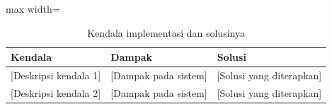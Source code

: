 \begin{table}[H]
  \centering
  \caption{Kendala implementasi dan solusinya}
  \label{tab:5.kendala}
  \begin{adjustbox}{max width=\textwidth}
  \begin{tabular}{p{5cm}p{4cm}p{4cm}}
    \toprule
    \textbf{Kendala} & \textbf{Dampak} & \textbf{Solusi} \\
    \midrule
    {[Deskripsi kendala 1]} & [Dampak pada sistem] & [Solusi yang diterapkan] \\
    {[Deskripsi kendala 2]} & [Dampak pada sistem] & [Solusi yang diterapkan] \\
    \bottomrule
  \end{tabular}
  \end{adjustbox}
\end{table}
